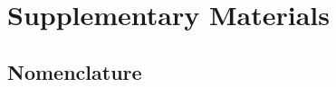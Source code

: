 \documentclass[9pt,twocolumn,twoside]{osajnl}
\begin{document}
\newpage
\newpage


\renewcommand{\thefigure}{S\arabic{figure}}
\renewcommand{\thetable}{S\arabic{table}}
\renewcommand{\theequation}{S\arabic{equation}}
\renewcommand{\thepage}{S\arabic{page}}
\setcounter{figure}{0}
\setcounter{table}{0}
\setcounter{equation}{0}
\setcounter{page}{1} %



\section*{Supplementary Materials}



\subsection*{Nomenclature}
\end{document}
